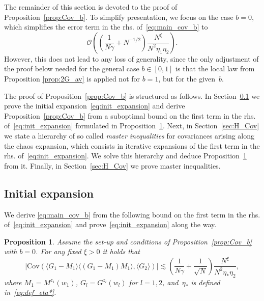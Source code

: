 \documentclass[10pt]{amsart}
\newtheorem{proposition}[theorem]{Proposition}
\numberwithin{equation}{section}
\newcommand{\Cov}{\mathrm{Cov}}
\begin{document}
The remainder of this section is devoted to the proof of Proposition~\ref{prop:Cov_b}. To simplify presentation, we focus on the case $b=0$, which simplifies the error term in the rhs. of~\eqref{eq:main_cov_b} to 
\begin{equation*}
\mathcal{O}\left(\left(\frac{1}{N\gamma} + N^{-1/2} \right)\frac{N^\xi}{N^2\eta_1\eta_2}\right).
\end{equation*}
However, this does not lead to any loss of generality, since the only adjustment of the proof below needed for the general case $b\in [0,1]$ is that the local law from Proposition \ref{prop:2G_av} is applied not for $b=1$, but for the given~$b$.

The proof of Proposition~\ref{prop:Cov_b} is structured as follows. In Section~\ref{sec:Cov_reduction} we prove the initial expansion~\eqref{eq:init_expansion} and derive Proposition~\ref{prop:Cov_b} from a suboptimal bound on the first term in the rhs. of~\eqref{eq:init_expansion} formulated in Proposition~\ref{prop:psi_22}. Next, in Section~\ref{sec:H_Cov} we state a hierarchy of so called \emph{master inequalities} for covariances arising along the chaos expansion, which consists in iterative expansions of the first term in the rhs. of~\eqref{eq:init_expansion}. We solve this hierarchy and deduce Proposition~\ref{prop:psi_22} from it. Finally, in Section~\ref{sec:H_Cov} we prove master inequalities. 


\subsection{Initial expansion}\label{sec:Cov_reduction}  We derive \eqref{eq:main_cov_b} from the following bound on the first term in the rhs. of~\eqref{eq:init_expansion} and prove~\eqref{eq:init_expansion} along the way.

\begin{proposition}\label{prop:psi_22} Assume the set-up and conditions of Proposition~\ref{prop:Cov_b} with $b=0$. For any fixed $\xi>0$ it holds that
\begin{equation}
\left\vert\Cov(\langle G_1-M_1\rangle\langle (G_1-M_1)M_1\rangle,\langle G_2\rangle)\right\vert \lesssim \left(\frac{1}{N\gamma}+\frac{1}{\sqrt{N}}\right)\frac{N^\xi}{N^2\eta_*\eta_2},
\label{eq:psi_22}
\end{equation}
where $M_1=M^{z_1}(w_1)$, $G_l=G^{z_l}(w_l)$ for $l=1,2$, and~$\eta_*$ is defined in~\eqref{eq:def_eta*}.
\end{proposition}
\end{document}
